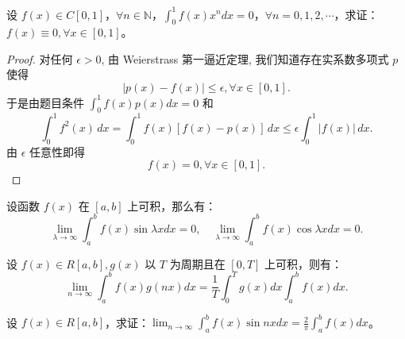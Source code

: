 \documentclass[lang=cn,10pt,thmcnt=section]{elegantbook}
\begin{document}
\begin{example}
	设 $f(x) \in C[0, 1]$，$\forall n \in \mathbb{N}$，$\int_0^1 f(x) x^n dx = 0$，$\forall n = 0, 1, 2, \cdots$，求证：$f(x) \equiv 0, \forall x \in [0, 1]$。
\end{example}
\begin{proof}
	对任何 $\epsilon > 0$, 由 Weierstrass 第一逼近定理, 我们知道存在实系数多项式 $p$ 使得
    \[
        |p(x) - f(x)| \le \epsilon, \forall x \in [0, 1].
    \]
    于是由题目条件 $\int_0^1 f(x)p(x)dx = 0$ 和
    \[
        \int_0^1 f^2(x) \, dx = \int_0^1 f(x)[f(x) - p(x)] \, dx \le \epsilon \int_0^1 |f(x)| \, dx.
    \]
    由 $\epsilon$ 任意性即得
    \[
        f(x) = 0, \forall x \in [0, 1].
    \]
\end{proof}
\begin{example}[Riemann 引理]
	设函数 $f(x)$ 在 $[a, b]$ 上可积，那么有：
\[
\lim_{\lambda \to \infty} \int_a^b f(x) \sin \lambda x dx = 0, \quad \lim_{\lambda \to \infty} \int_a^b f(x) \cos \lambda x dx = 0.
\]
\end{example}
\begin{example}
	设 $f(x) \in R[a, b], g(x)$ 以 $T$ 为周期且在 $[0, T]$ 上可积，则有：
    \[
    \lim_{n \to \infty} \int_a^b f(x) g(nx) dx = \frac{1}{T} \int_0^T g(x) dx \int_a^b f(x) dx.
    \]
\end{example}
\begin{example}
	设 $f(x) \in R[a, b]$，求证：$\lim_{n \to \infty} \int_a^b f(x) \sin nx dx = \frac{2}{\pi} \int_a^b f(x) dx$。
\end{example}
\end{document}
